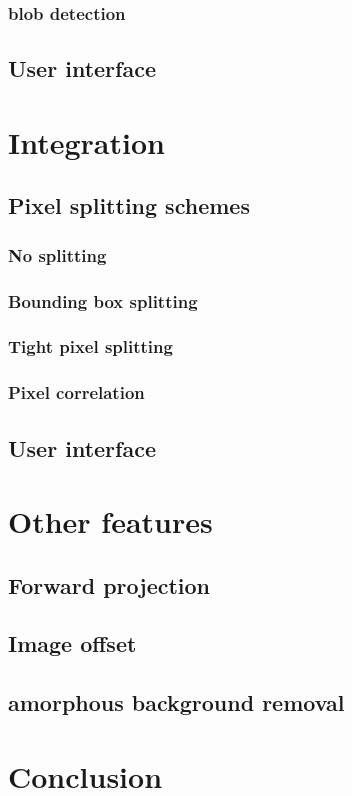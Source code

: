 \documentclass[preprint]{iucr}
\begin{document}
\subsubsection{blob detection}
\subsection{User interface}
\section{Integration}
\subsection{Pixel splitting schemes}
\subsubsection{No splitting}
\subsubsection{Bounding box splitting}
\subsubsection{Tight pixel splitting}
\subsubsection{Pixel correlation}
\subsection{User interface}
\section{Other features}
\subsection{Forward projection}
\subsection{Image offset}
\subsection{amorphous background removal}

\section{Conclusion}
\end{document}
